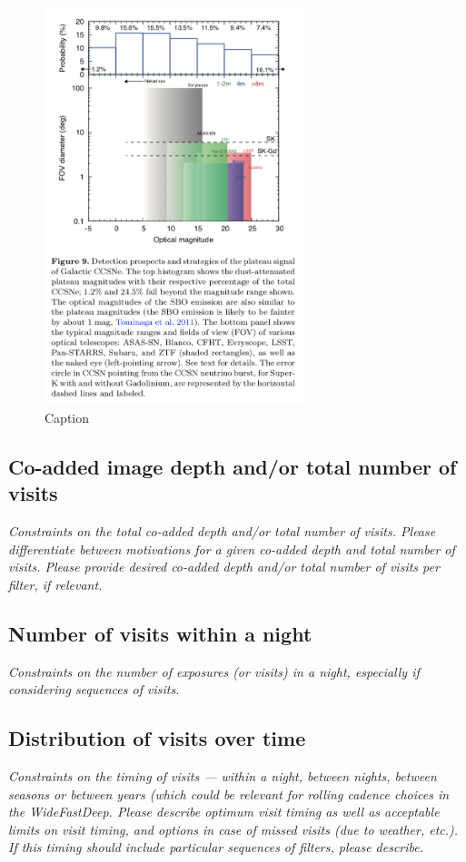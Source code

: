 \documentclass[11pt]{article}
\begin{document}
\begin{figure}
  \begin{center}
    \includegraphics[width=3.0in]{multimessenger-comparison}
    \caption{Caption}
    \label{fig:multimessenger-comparison}
  \end{center}
\end{figure}

\subsection{Co-added image depth and/or total number of visits}
\begin{footnotesize}{\it  Constraints on the total co-added depth and/or total number of visits.
Please differentiate between motivations for a given co-added depth and total number of visits. 
Please provide desired co-added depth and/or total number of visits per filter, if relevant.}
\end{footnotesize}

\subsection{Number of visits within a night}
\begin{footnotesize}{\it Constraints on the number of exposures (or visits) in a night, especially if considering sequences of visits.  }
\end{footnotesize}

\subsection{Distribution of visits over time}
\begin{footnotesize}{\it Constraints on the timing of visits --- within a night, between nights, between seasons or
between years (which could be relevant for rolling cadence choices in the WideFastDeep. 
Please describe optimum visit timing as well as acceptable limits on visit timing, and options in
case of missed visits (due to weather, etc.). If this timing should include particular sequences
of filters, please describe.}
\end{footnotesize}
\end{document}
